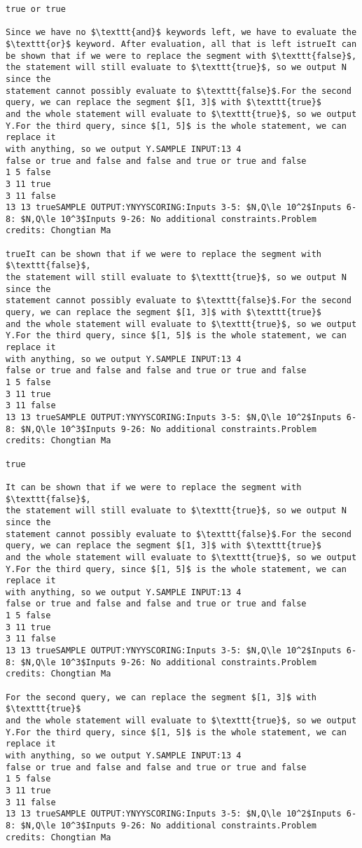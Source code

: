 \documentclass[12pt]{article}
\begin{document}
\begin{verbatim}
true or true

Since we have no $\texttt{and}$ keywords left, we have to evaluate the
$\texttt{or}$ keyword. After evaluation, all that is left istrueIt can be shown that if we were to replace the segment with $\texttt{false}$,
the statement will still evaluate to $\texttt{true}$, so we output N since the
statement cannot possibly evaluate to $\texttt{false}$.For the second query, we can replace the segment $[1, 3]$ with $\texttt{true}$
and the whole statement will evaluate to $\texttt{true}$, so we output Y.For the third query, since $[1, 5]$ is the whole statement, we can replace it
with anything, so we output Y.SAMPLE INPUT:13 4
false or true and false and false and true or true and false
1 5 false
3 11 true
3 11 false
13 13 trueSAMPLE OUTPUT:YNYYSCORING:Inputs 3-5: $N,Q\le 10^2$Inputs 6-8: $N,Q\le 10^3$Inputs 9-26: No additional constraints.Problem credits: Chongtian Ma

trueIt can be shown that if we were to replace the segment with $\texttt{false}$,
the statement will still evaluate to $\texttt{true}$, so we output N since the
statement cannot possibly evaluate to $\texttt{false}$.For the second query, we can replace the segment $[1, 3]$ with $\texttt{true}$
and the whole statement will evaluate to $\texttt{true}$, so we output Y.For the third query, since $[1, 5]$ is the whole statement, we can replace it
with anything, so we output Y.SAMPLE INPUT:13 4
false or true and false and false and true or true and false
1 5 false
3 11 true
3 11 false
13 13 trueSAMPLE OUTPUT:YNYYSCORING:Inputs 3-5: $N,Q\le 10^2$Inputs 6-8: $N,Q\le 10^3$Inputs 9-26: No additional constraints.Problem credits: Chongtian Ma

true

It can be shown that if we were to replace the segment with $\texttt{false}$,
the statement will still evaluate to $\texttt{true}$, so we output N since the
statement cannot possibly evaluate to $\texttt{false}$.For the second query, we can replace the segment $[1, 3]$ with $\texttt{true}$
and the whole statement will evaluate to $\texttt{true}$, so we output Y.For the third query, since $[1, 5]$ is the whole statement, we can replace it
with anything, so we output Y.SAMPLE INPUT:13 4
false or true and false and false and true or true and false
1 5 false
3 11 true
3 11 false
13 13 trueSAMPLE OUTPUT:YNYYSCORING:Inputs 3-5: $N,Q\le 10^2$Inputs 6-8: $N,Q\le 10^3$Inputs 9-26: No additional constraints.Problem credits: Chongtian Ma

For the second query, we can replace the segment $[1, 3]$ with $\texttt{true}$
and the whole statement will evaluate to $\texttt{true}$, so we output Y.For the third query, since $[1, 5]$ is the whole statement, we can replace it
with anything, so we output Y.SAMPLE INPUT:13 4
false or true and false and false and true or true and false
1 5 false
3 11 true
3 11 false
13 13 trueSAMPLE OUTPUT:YNYYSCORING:Inputs 3-5: $N,Q\le 10^2$Inputs 6-8: $N,Q\le 10^3$Inputs 9-26: No additional constraints.Problem credits: Chongtian Ma


\end{verbatim}
\end{document}
